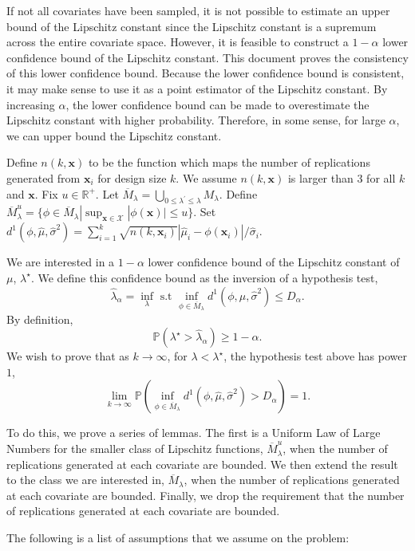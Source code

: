 \documentclass[12pt]{article}
\newcommand{\spa}[1]{\text{{$\mathcal{#1}$}}}
\newcommand{\des}{\ensuremath{\bm{x}}}
\newcommand{\vect}[1]{\ensuremath{\bm{#1}}}
\begin{document}
If not all covariates have been sampled, it is not possible to estimate an upper bound of the Lipschitz constant since the Lipschitz constant is a supremum across the entire covariate space. However, it is feasible to construct a $1-\alpha$ lower confidence bound of the Lipschitz constant. This document proves the consistency of this lower confidence bound. Because the lower confidence bound is consistent, it may make sense to use it as a point estimator of the Lipschitz constant. By increasing $\alpha$, the lower confidence bound can be made to overestimate the Lipschitz constant with higher probability. Therefore, in some sense, for large $\alpha$, we can upper bound the Lipschitz constant. 

Define $n(k,\vect{x})$ to be the function which maps the number of replications generated from $\vect{x}_i$ for design size $k$. We assume $n(k,\vect{x})$ is larger than 3 for all $k$ and $\vect{x}$. Fix $u\in \mathbb{R}^+$. Let $\overline{M}_\lambda=\bigcup_{0\leq \lambda^\prime \leq \lambda }M_\lambda$. Define $\overline{M}^u_\lambda=\{\phi \in \overline{M}_\lambda|\sup_{\vect{x}\in \spa{X}}|\phi(\vect{x})|\leq u\}$. Set $d^1(\phi,\hat{\mu},\hat{\sigma}^2)=\sum_{i=1}^k\sqrt{n(k,\des_i)}|\hat{\mu}_i-\phi(\des_i)|/\hat{\sigma}_i$.

We are interested in a $1-\alpha$ lower confidence bound of the Lipschitz constant of $\mu$, $\lambda^\star$. We define this confidence bound as the inversion of a hypothesis test,
$$\hat{\lambda}_\alpha=\inf_{\lambda} \text{ s.t } \inf_{\phi \in \overline{M}_\lambda} d^1(\phi,\hat{\mu},\hat{\sigma}^2) \leq D_\alpha.$$
By definition,
$$\mathbb{P}\left (\lambda^\star>\hat{\lambda}_\alpha \right )\geq 1-\alpha.$$
We wish to prove that as $k \to \infty$, for $\lambda<\lambda^\star$, the hypothesis test above has power $1$,
$$\lim_{k \to \infty} \mathbb{P}\left (\inf_{\phi \in \overline{M}_\lambda} d^1(\phi,\hat{\mu},\hat{\sigma}^2)>D_\alpha \right )=1.$$

To do this, we prove a series of lemmas. The first is a Uniform Law of Large Numbers for the smaller class of Lipschitz functions, $\overline{M}_\lambda^u$, when the number of replications generated at each covariate are bounded. We then extend the result to the class we are interested in, $\overline{M}_\lambda$, when the number of replications generated at each covariate are bounded. Finally, we drop the requirement that the number of replications generated at each covariate are bounded.

The following is a list of assumptions that we assume on the problem:
\end{document}
